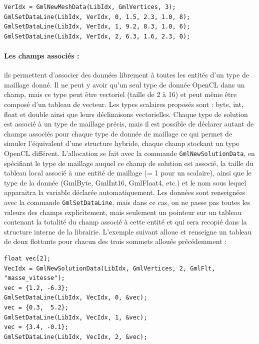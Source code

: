 \documentclass[a4paper,12pt]{article}
\begin{document}
\begin{tt}
\begin{verbatim}
VerIdx = GmlNewMeshData(LibIdx, GmlVertices, 3);
GmlSetDataLine(LibIdx, VerIdx, 0, 1.5, 2.3, 1.0, 8);
GmlSetDataLine(LibIdx, VerIdx, 1, 9.2, 8.3, 1.0, 6);
GmlSetDataLine(LibIdx, VerIdx, 2, 6.3, 1.6, 2.3, 0);
\end{verbatim}
\end{tt}
\normalfont

\paragraph{Les champs associés : } ils permettent d'associer des données librement à toutes les entités d'un type de maillage donné. Il ne peut y avoir qu'un seul type de donnée OpenCL dans un champ, mais ce type peut être vectoriel (taille de 2 à 16) et peut même être composé d'un tableau de vecteur.
Les types scalaires proposés sont : byte, int, float et double ainsi que leurs déclinaisons vectorielles.
Chaque type de solution est associé à un type de maillage précis, mais il est possible de déclarer autant de champs associés pour chaque type de donnée de maillage ce qui permet de simuler l’équivalent d'une structure hybride, chaque champ stockant un type OpenCL différent.
L'allocation se fait avec la commande {\tt GmlNewSolutionData}, en spécifiant le type de maillage auquel ce champ de solution est associé, la taille du tableau local associé à une entité de maillage (= 1 pour un scalaire), ainsi que le type de la donnée (GmlByte, GmlInt16, GmlFloat4, etc.) et le nom sous lequel apparaitra la variable déclarée automatiquement.
Les données sont renseignées avec la commande {\tt GmlSetDataLine}, mais dans ce cas, on ne passe pas toutes les valeurs des champs explicitement, mais seulement un pointeur sur un tableau contenant la totalité du champ associé à cette entité et qui sera recopié dans la structure interne de la librairie.
L'exemple suivant alloue et renseigne un tableau de deux flottants pour chacun des trois sommets alloués précédemment :

\begin{tt}
\begin{verbatim}
float vec[2];
VecIdx = GmlNewSolutionData(LibIdx, GmlVertices, 2, GmlFlt, "masse_vitesse");
vec = {1.2, -6.3};
GmlSetDataLine(LibIdx, VecIdx, 0, &vec);
vec = {0.3,  5.2};
GmlSetDataLine(LibIdx, VecIdx, 1, &vec);
vec = {3.4, -0.1};
GmlSetDataLine(LibIdx, VecIdx, 2, &vec);
\end{verbatim}
\end{tt}
\normalfont
\end{document}
